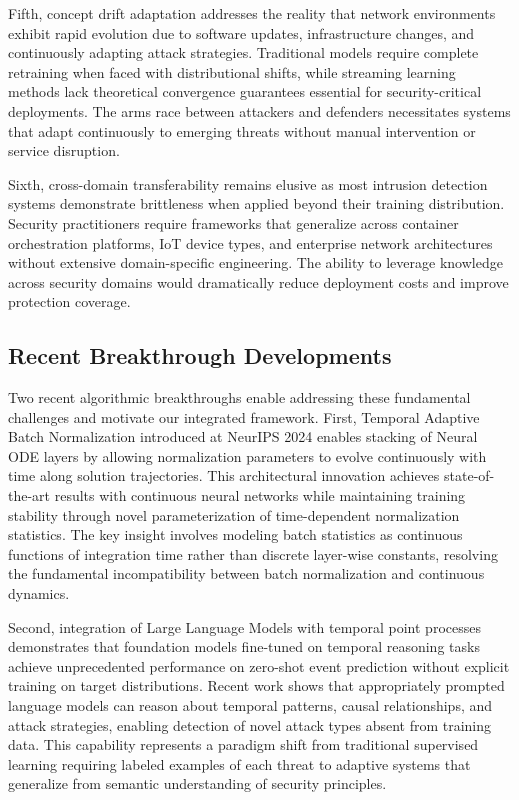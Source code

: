 \documentclass[10pt,journal,compsoc]{IEEEtran}
\begin{document}
Fifth, concept drift adaptation addresses the reality that network environments exhibit rapid evolution due to software updates, infrastructure changes, and continuously adapting attack strategies. Traditional models require complete retraining when faced with distributional shifts, while streaming learning methods lack theoretical convergence guarantees essential for security-critical deployments. The arms race between attackers and defenders necessitates systems that adapt continuously to emerging threats without manual intervention or service disruption.

Sixth, cross-domain transferability remains elusive as most intrusion detection systems demonstrate brittleness when applied beyond their training distribution. Security practitioners require frameworks that generalize across container orchestration platforms, IoT device types, and enterprise network architectures without extensive domain-specific engineering. The ability to leverage knowledge across security domains would dramatically reduce deployment costs and improve protection coverage.

\subsection{Recent Breakthrough Developments}

Two recent algorithmic breakthroughs enable addressing these fundamental challenges and motivate our integrated framework. First, Temporal Adaptive Batch Normalization introduced at NeurIPS 2024 enables stacking of Neural ODE layers by allowing normalization parameters to evolve continuously with time along solution trajectories. This architectural innovation achieves state-of-the-art results with continuous neural networks while maintaining training stability through novel parameterization of time-dependent normalization statistics. The key insight involves modeling batch statistics as continuous functions of integration time rather than discrete layer-wise constants, resolving the fundamental incompatibility between batch normalization and continuous dynamics.

Second, integration of Large Language Models with temporal point processes demonstrates that foundation models fine-tuned on temporal reasoning tasks achieve unprecedented performance on zero-shot event prediction without explicit training on target distributions. Recent work shows that appropriately prompted language models can reason about temporal patterns, causal relationships, and attack strategies, enabling detection of novel attack types absent from training data. This capability represents a paradigm shift from traditional supervised learning requiring labeled examples of each threat to adaptive systems that generalize from semantic understanding of security principles.
\end{document}
